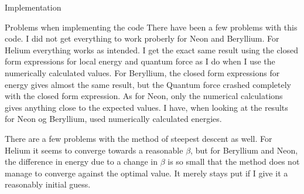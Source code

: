 \documentclass[a4paper, 12pt, titlepage]{article}
\begin{document}
\begin{section}{Implementation}
 \begin{subsection}{Problems when implementing the code}
  There have been a few problems with this code. I did not get everything to work proberly for Neon and Beryllium. For Helium everything works as intended. I get the exact same result using the closed form expressions for local energy and quantum force as I do when I use the numerically calculated values. For Beryllium, the closed form expressions for energy gives almost the same result, but the Quantum force crashed completely with the closed form expression. As for Neon, only the numerical calculations gives anything close to the expected values. I have, when looking at the results for Neon og Beryllium, used numerically calculated energies.

  There are a few problems with the method of steepest descent as well. For Helium it seems to converge towards a reasonable $\beta$, but for Beryllium and Neon, the difference in energy due to a change in $\beta$ is so small that the method does not manage to converge against the optimal value. It merely stays put if I give it a reasonably initial guess. 
 \end{subsection}

\end{section}
 \newpage
\end{document}
